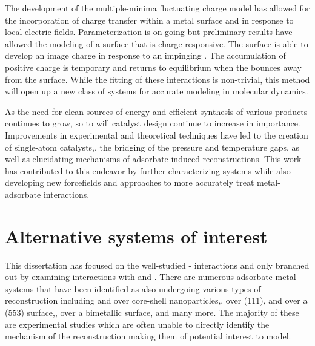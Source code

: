%
The development of the multiple-minima fluctuating charge model has allowed for
the incorporation of charge transfer within a metal surface and in response to
local electric fields. Parameterization is on-going but preliminary results
have allowed the modeling of a  surface that is charge responsive. The
surface is able to develop an image charge in response to an impinging .
The accumulation of positive charge is temporary and returns to equilibrium
when the  bounces away from the surface. While the fitting of these
interactions is non-trivial, this method will open up a new class of systems
for accurate modeling in molecular dynamics.

As the need for clean sources of energy and efficient synthesis of various
products continues to grow, so to will catalyst design continue to increase in
importance.  Improvements in experimental and theoretical techniques have led
to the creation of single-atom catalysts,\citep{Qiao:2011zp, Yang:2013sf}, the
bridging of the pressure and temperature gaps,\citep{Tao:2010aa, Eren:2016qt}
as well as elucidating mechanisms of adsorbate induced
reconstructions. \citep{Michalka:2013aa,Kim:2016cr} This work has contributed to
this endeavor by further characterizing  systems while also
developing new forcefields and approaches to more accurately treat
metal-adsorbate interactions.



\section{Alternative systems of interest}
This dissertation has focused on the well-studied - interactions
and only branched out by examining  interactions with  and
.  There are numerous adsorbate-metal systems that have been identified
as also undergoing various types of reconstruction including  and
 over  core-shell nanoparticles,\citep{Tao:2008aa},
 over  (111),\citep{Eren:2016qt}  and  over a (553)
 surface,\citep{Zhang:2015zr},  over a  bimetallic
surface,\citep{Kim:2013mi} and many more. The majority of these are experimental
studies which are often unable to directly identify the mechanism of the
reconstruction making them of potential interest to model.

